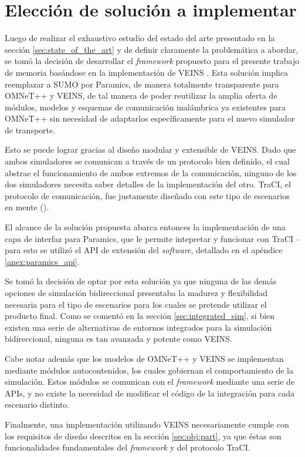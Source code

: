 \section{Elección de solución a implementar}\label{sec:solution}

Luego de realizar el exhaustivo estudio del estado del arte presentado en la sección \ref{sec:state_of_the_art} y de definir claramente la problemática a abordar, se tomó la decisión de desarrollar el \emph{framework} propuesto para el presente trabajo de memoria basándose en la implementación de VEINS \autocite{sommer_german_dressler, sommer_dressler2}. Esta solución implica reemplazar a SUMO por Paramics, de manera totalmente transparente para OMNeT++ y VEINS, de tal manera de poder reutilizar la amplia oferta de módulos, modelos y esquemas de comunicación inalámbrica ya existentes para OMNeT++ sin necesidad de adaptarlos específicamente para el nuevo simulador de transporte. 

Esto se puede lograr gracias al diseño modular y extensible de VEINS. Dado que ambos simuladores se comunican a través de un protocolo bien definido, el cual abstrae el funcionamiento de ambos extremos de la comunicación, ninguno de los dos simuladores necesita saber detalles de la implementación del otro. TraCI, el protocolo de comunicación, fue justamente diseñado con este tipo de escenarios en mente (\autocite{traci}).

El alcance de la solución propuesta abarca entonces la implementación de una capa de interfaz para Paramics, que le permite intepretar y funcionar con TraCI -- para esto se utilizó el API de extensión del \emph{software}, detallado en el apéndice \ref{anex:paramics_api}. 

Se tomó la decisión de optar por esta solución ya que ninguna de las demás opciones de simulación bidireccional presentaba la madurez y flexibilidad necesaria para el tipo de escenarios para los cuales se pretende utilizar el producto final. Como se comentó en la sección \ref{sec:integrated_sim}, si bien existen una serie de alternativas de entornos integrados para la simulación bidireccional, ninguna es tan avanzada y potente como VEINS.

Cabe notar además que los modelos de OMNeT++ y VEINS se implementan mediante módulos autocontenidos, los cuales gobiernan el comportamiento de la simulación. Estos módulos se comunican con el \emph{framework} mediante una serie de APIs, y no existe la necesidad de modificar el código de la integración para cada escenario distinto.

Finalmente, una implementación utilizando VEINS necesariamente cumple con los requisitos de diseño descritos en la sección \ref{sec:obj:part}, ya que éstas son funcionalidades fundamentales del \emph{framework} y del protocolo TraCI.